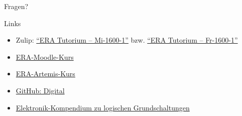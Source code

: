 \begin{frame}[c, fragile]{}{}
	\begin{center}
		\LARGE Fragen?
	\end{center}
\end{frame}

\begin{frame}[c, fragile]{Links}{}
	\begin{itemize}
		\item Zulip: \href{https://zulip.cit.tum.de/#narrow/channel/3254-ERA-Tutorium-.E2.80.93-Mi-1600-1}{\enquote{ERA Tutorium -- Mi-1600-1}}
		      bzw. \href{https://zulip.cit.tum.de/#narrow/channel/3266-ERA-Tutorium-.E2.80.93-Fr-1600-1}{\enquote{ERA Tutorium -- Fr-1600-1}}
		\item \href{https://www.moodle.tum.de/course/view.php?id=121343}{ERA-Moodle-Kurs}
		\item \href{https://artemis.tum.de/courses/596/exercises/21744}{ERA-Artemis-Kurs}
		\item \href{https://github.com/hneemann/Digital}{GitHub: Digital}
		\item \href{https://www.elektronik-kompendium.de/sites/dig/2609191.htm}{Elektronik-Kompendium zu logischen Grundschaltungen}
	\end{itemize}
\end{frame}

\maketitle


